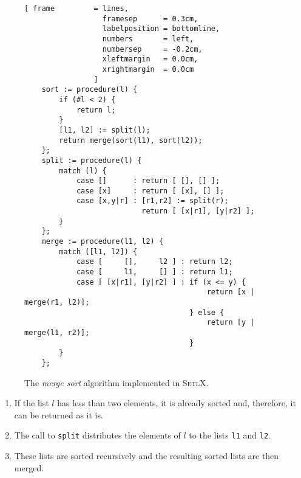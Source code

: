 \begin{figure}[!ht]
  \centering
\begin{Verbatim}[ frame         = lines, 
                  framesep      = 0.3cm, 
                  labelposition = bottomline,
                  numbers       = left,
                  numbersep     = -0.2cm,
                  xleftmargin   = 0.0cm,
                  xrightmargin  = 0.0cm
                ]
    sort := procedure(l) {
        if (#l < 2) {
            return l;
        }
        [l1, l2] := split(l);
        return merge(sort(l1), sort(l2));
    };
    split := procedure(l) {
        match (l) {
            case []      : return [ [], [] ];
            case [x]     : return [ [x], [] ];
            case [x,y|r] : [r1,r2] := split(r);
                           return [ [x|r1], [y|r2] ];
        }
    };
    merge := procedure(l1, l2) {
        match ([l1, l2]) {
            case [     [],     l2 ] : return l2;
            case [     l1,     [] ] : return l1;
            case [ [x|r1], [y|r2] ] : if (x <= y) {
                                          return [x | merge(r1, l2)];
                                      } else {
                                          return [y | merge(l1, r2)];
                                      }
        }
    };
\end{Verbatim}
\vspace*{-0.3cm}
  \caption{The \emph{merge sort} algorithm implemented in \textsc{SetlX}.}
  \label{fig:merge-sort.stlx}
\end{figure}
\begin{enumerate}
\item If the list $l$ has less than two elements, it is already sorted and, therefore, it
      can be returned as it is.
\item The call to \texttt{split} distributes the elements of $l$ to the lists \texttt{l1} and \texttt{l2}.
\item These lists are sorted recursively and the resulting sorted lists are then merged.
\end{enumerate}

